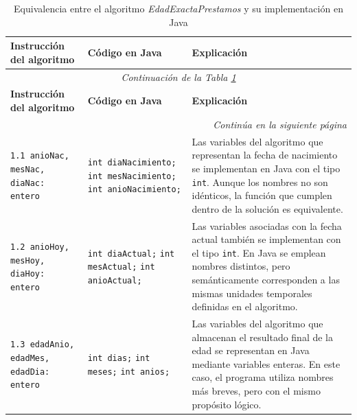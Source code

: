 \documentclass[12pt,twoside]{book}
\begin{document}
					\begin{landscape}
						
						\begin{longtable}{p{6cm} p{6cm} p{7cm}}
							
							\caption{Equivalencia entre el algoritmo \textit{EdadExactaPrestamos} y su implementación en Java}
							\label{tab:edadExactaEquivalencia} \\
							
							\toprule
							\textbf{Instrucción del algoritmo} & \textbf{Código en Java} & \textbf{Explicación} \\
							\midrule
							\endfirsthead
							
							\multicolumn{3}{c}{\textit{Continuación de la Tabla \ref{tab:edadExactaEquivalencia}}} \\
							\toprule
							\textbf{Instrucción del algoritmo} & \textbf{Código en Java} & \textbf{Explicación} \\
							\midrule
							\endhead
							
							\midrule
							\multicolumn{3}{r}{\textit{Continúa en la siguiente página}} \\
							\endfoot
							
							\bottomrule
							\endlastfoot
							
							
							\texttt{1.1 anioNac, mesNac, diaNac: entero}
							&
							\texttt{int diaNacimiento;} \newline
							\texttt{int mesNacimiento;} \newline
							\texttt{int anioNacimiento;}
							&
							Las variables del algoritmo que representan la fecha de nacimiento se implementan en Java con el tipo \texttt{int}. Aunque los nombres no son idénticos, la función que cumplen dentro de la solución es equivalente. \\
							
							
							\texttt{1.2 anioHoy, mesHoy, diaHoy: entero}
							&
							\texttt{int diaActual;} \newline
							\texttt{int mesActual;} \newline
							\texttt{int anioActual;}
							&
							Las variables asociadas con la fecha actual también se implementan con el tipo \texttt{int}. En Java se emplean nombres distintos, pero semánticamente corresponden a las mismas unidades temporales definidas en el algoritmo. \\
							
							
							\texttt{1.3 edadAnio, edadMes, edadDia: entero}
							&
							\texttt{int dias;} \newline
							\texttt{int meses;} \newline
							\texttt{int anios;}
							&
							Las variables del algoritmo que almacenan el resultado final de la edad se representan en Java mediante variables enteras. En este caso, el programa utiliza nombres más breves, pero con el mismo propósito lógico. \\
							

\end{longtable}
\end{landscape}
\end{document}
